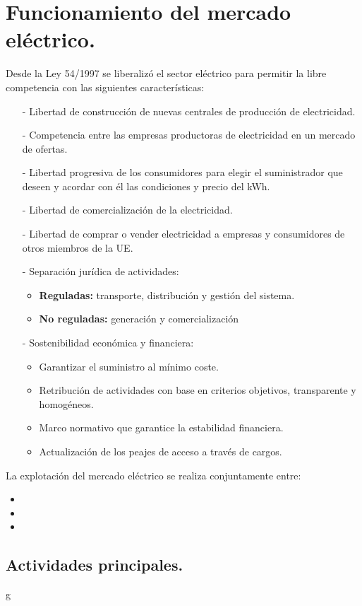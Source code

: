 \section{Funcionamiento del mercado eléctrico.}
Desde la Ley 54/1997 se liberalizó el sector eléctrico para permitir la libre competencia con las siguientes características:
\begin{itemize}
	\item [-] Libertad de construcción de nuevas centrales de producción de electricidad.
	\item [-] Competencia entre las empresas productoras de electricidad en un mercado de ofertas.
	\item [-] Libertad progresiva de los consumidores para elegir el suministrador que deseen y acordar con
	él las condiciones y precio del kWh.
	\item [-] Libertad de comercialización de la electricidad.
	\item [-] Libertad de comprar o vender electricidad a empresas y consumidores de otros miembros de
	la UE.
	\item [-] Separación jurídica de actividades:
	\begin{itemize}
		\item \textbf{Reguladas:} transporte, distribución y gestión del sistema.
		\item \textbf{No reguladas:} generación y comercialización
	\end{itemize}
	\item [-] Sostenibilidad económica y financiera:
	\begin{itemize}
		\item Garantizar el suministro al mínimo coste.
		\item Retribución de actividades con base en criterios objetivos, transparente y homogéneos.
		\item Marco normativo que garantice la estabilidad financiera.
		\item  Actualización de los peajes de acceso a través de cargos.
	\end{itemize}
\end{itemize}
La explotación del mercado eléctrico se realiza conjuntamente entre:
\begin{itemize}
	\item 
	\item
	\item
\end{itemize}
\subsection{Actividades principales.}
g
